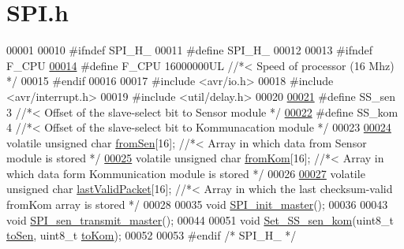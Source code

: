 \hypertarget{_s_p_i_8h_source}{}\section{S\+P\+I.\+h}
\label{_s_p_i_8h_source}

\begin{DoxyCode}
00001 
00010 \textcolor{preprocessor}{#ifndef SPI\_H\_}
00011 \textcolor{preprocessor}{#define SPI\_H\_}
00012 
00013 \textcolor{preprocessor}{#ifndef F\_CPU}
\hypertarget{_s_p_i_8h_source.tex_l00014}{}\hyperlink{_s_p_i_8h_a43bafb28b29491ec7f871319b5a3b2f8}{00014} \textcolor{preprocessor}{#define F\_CPU 16000000UL //*< Speed of processor (16 Mhz) */}
00015 \textcolor{preprocessor}{#endif}
00016 
00017 \textcolor{preprocessor}{#include <avr/io.h>}
00018 \textcolor{preprocessor}{#include <avr/interrupt.h>}
00019 \textcolor{preprocessor}{#include <util/delay.h>}
00020 
\hypertarget{_s_p_i_8h_source.tex_l00021}{}\hyperlink{_s_p_i_8h_a58ac62acddf451691b748c71454e0137}{00021} \textcolor{preprocessor}{#define SS\_sen 3 //*< Offset of the slave-select bit to Sensor module */}
\hypertarget{_s_p_i_8h_source.tex_l00022}{}\hyperlink{_s_p_i_8h_acbbd0eb471ac972ee5d3bb2563a6c72e}{00022} \textcolor{preprocessor}{#define SS\_kom 4 //*< Offset of the slave-select bit to Kommunacation module */}
00023 
\hypertarget{_s_p_i_8h_source.tex_l00024}{}\hyperlink{_s_p_i_8h_a2963725e5681e7e146da28127b3e09d3}{00024} \textcolor{keyword}{volatile} \textcolor{keywordtype}{unsigned} \textcolor{keywordtype}{char} \hyperlink{_s_p_i_8h_a2963725e5681e7e146da28127b3e09d3}{fromSen}[16]; \textcolor{comment}{//*< Array in which data from Sensor module is stored */}
\hypertarget{_s_p_i_8h_source.tex_l00025}{}\hyperlink{_s_p_i_8h_a4c1a44ecc2e0f0cf45cf9b6c0bc3e645}{00025} \textcolor{keyword}{volatile} \textcolor{keywordtype}{unsigned} \textcolor{keywordtype}{char} \hyperlink{_s_p_i_8h_a4c1a44ecc2e0f0cf45cf9b6c0bc3e645}{fromKom}[16]; \textcolor{comment}{//*< Array in which data form Kommunication module is stored */}
00026 
\hypertarget{_s_p_i_8h_source.tex_l00027}{}\hyperlink{_s_p_i_8h_ab15ab508531e452eb0768f69f7c588da}{00027} \textcolor{keyword}{volatile} \textcolor{keywordtype}{unsigned} \textcolor{keywordtype}{char} \hyperlink{_s_p_i_8h_ab15ab508531e452eb0768f69f7c588da}{lastValidPacket}[16]; \textcolor{comment}{//*< Array in which the last checksum-valid
       fromKom array is stored */}
00028 
00035 \textcolor{keywordtype}{void} \hyperlink{_s_p_i_8h_a49ddfef1b082be9cebd28e4bbebf247d}{SPI\_init\_master}();
00036 
00043 \textcolor{keywordtype}{void} \hyperlink{_s_p_i_8h_aef55913736b574735fdfca21de557988}{SPI\_sen\_transmit\_master}();
00044 
00051 \textcolor{keywordtype}{void} \hyperlink{_s_p_i_8h_a21ae89e79b07cfb95e2674541cf5ee27}{Set\_SS\_sen\_kom}(uint8\_t \hyperlink{_s_p_i_8c_a877332cdcfad9d61a433fda50f5fb1b5}{toSen}, uint8\_t \hyperlink{_s_p_i_8c_ae9f07651aa8c38a27c260082879ab9b2}{toKom});
00052 
00053 \textcolor{preprocessor}{#endif }\textcolor{comment}{/* SPI\_H\_ */}\textcolor{preprocessor}{}
\end{DoxyCode}
